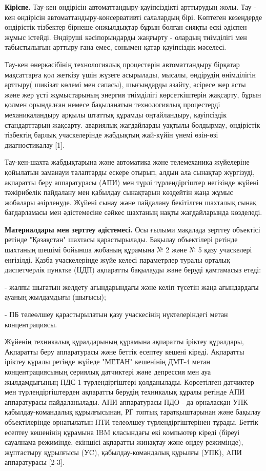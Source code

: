\vspace{1em}

\begin{multicols}{2}
{\bfseries Кіріспе.} Тау-кен өндірісін автоматтандыру-қауіпсіздікті
арттырудың жолы. Тау - кен өндірісін автоматтандыру-консервативті
салалардың бірі. Көптеген кезеңдерде өндірістік тізбектер бірнеше
онжылдықтар бұрын болған сияқты ескі әдіспен жұмыс істейді. Өндіруші
кәсіпорындарды жаңғырту - олардың тиімділігі мен табыстылығын арттыру
ғана емес, сонымен қатар қауіпсіздік мәселесі.

Тау-кен өнеркәсібінің технологиялық процестерін автоматтандыру бірқатар
мақсаттарға қол жеткізу үшін жүзеге асырылады, мысалы, өндірудің
өнімділігін арттыру( шикізат көлемі мен сапасы), шығындарды азайту,
әсіресе жер асты және жер үсті жұмыстарының энергия тиімділігі
көрсеткіштерін жақсарту, бұрын қолмен орындалған немесе бақыланатын
технологиялық процестерді механикаландыру арқылы штаттық құрамды
оңтайландыру, қауіпсіздік стандарттарын жақсарту. авариялық жағдайларды
уақтылы болдырмау, өндірістік тізбектің барлық учаскелерінде жабдықтың
жай-күйін үнемі өзін-өзі диагностикалау {[}1{]}.

Тау-кен-шахта жабдықтарына және автоматика және телемеханика жүйелеріне
қойылатын заманауи талаптарды ескере отырып, алдын ала сынақтар
жүргізуді, ақпаратты беру аппаратурасы (АПИ) мен түрлі түрлендіргіштер
негізінде жүйені тәжірибелік пайдалану мен қабылдау сынақтарын көздейтін
жаңа жұмыс жобалары әзірленуде. Жүйені сынау және пайдалану бекітілген
шахталық сынақ бағдарламасы мен әдістемесіне сәйкес шахтаның нақты
жағдайларында көзделеді.

{\bfseries Материалдары мен зерттеу әдістемесі.} Осы ғылыми мақалада
зерттеу объектісі ретінде "Қазақстан" шахтасы қарастырылады. Бақылау
объектілері ретінде шахтаның шешімі бойынша жобаның құрамына № 2 және №
5 қазу учаскелері енгізілді. Қазба учаскелерінде жүйе келесі параметрлер
туралы орталық диспетчерлік пунктке (ЦДП) ақпаратты бақылауды және
беруді қамтамасыз етеді:

- жалпы шығатын желдету ағындарындағы және келіп түсетін жаңа
ағындардағы ауаның жылдамдығы (шығысы);

- ПБ телеөлшеу қарастырылатын қазу учаскесінің нүктелеріндегі метан
концентрациясы.

Жүйенің техникалық құралдарының құрамына ақпаратты іріктеу құралдары,
Ақпаратты беру аппаратурасы және беттік есептеу кешені кіреді. Ақпаратты
іріктеу құралы ретінде жүйеде "МЕТАН" кешенінің ДМТ-4 метан
концентрациясының сериялық датчиктері және депрессия мен ауа
жылдамдығының ПДС-1 түрлендіргіштері қолданылады. Көрсетілген датчиктер
мен түрлендіргіштерден ақпаратты берудің техникалық құралы ретінде АПИ
аппаратурасы пайдаланылады. АПИ аппаратурасы ПДО - да орналасқан УПК
қабылдау-командалық құрылғысынан, РГ топтық таратқыштарынан және бақылау
объектілерінде орнатылатын ПТИ телеөлшеу түрлендіргіштерінен тұрады.
Беттік есептеу кешенінің құрамына IBM класындағы екі компьютер кіреді
(біреуі сауалнама режимінде, екіншісі ақпаратты жинақтау және өңдеу
режимінде), жұптастыру құрылғысы (УC), қабылдау-командалық құрылғы
(УПК), AПИ аппаратурасы {[}2-3{]}.


\end{multicols}
